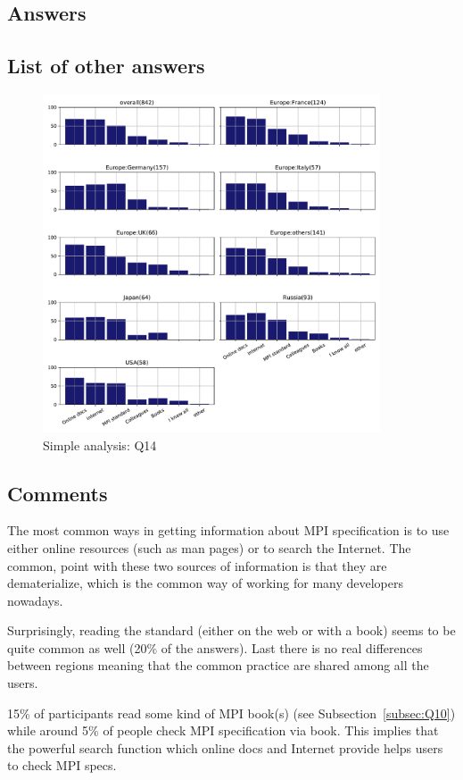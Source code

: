 
\subsection{Answers}



\subsection{List of other answers}
\begin{itemize}

\end{itemize}

\begin{figure}[htb]
\begin{center}
\includegraphics[width=10cm]{../pdfs/Q14.pdf}
\caption{Simple analysis: Q14}
\label{fig:Q14}
\end{center}
\end{figure}

\subsection{Comments}
The most common ways in getting information about MPI specification is to use
either online resources (such as man pages) or to search the Internet. The
common, point with these two sources of information is that they are
dematerialize, which is the common way of working for many developers nowadays.   


Surprisingly, reading the standard (either on the web or with a book) seems to
be quite common as well (20\% of the answers). Last there is no real differences
between regions meaning that the common practice are shared among all the
users. 


15\% of participants read some kind of MPI book(s) (see
Subsection~\ref{subsec:Q10}) while around 5\% of people check MPI
specification via book. This implies that the powerful search function
which online docs and Internet provide helps users to check MPI specs.
